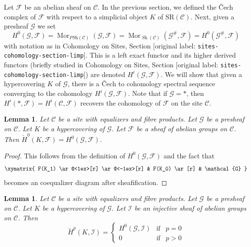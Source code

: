 \documentclass[10pt,a4paper]{article}
\theoremstyle{plain}
\newtheorem{lemma}[subsection]{Lemma}
\theoremstyle{definition}
\theoremstyle{remark}
\numberwithin{equation}{subsection}
\def\Mor{\mathop{\mathrm{Mor}}\nolimits}
\def\Sh{\mathop{\mathit{Sh}}\nolimits}
\begin{document}
\medskip\noindent
Let $\mathcal{F}$ be an abelian sheaf on $\mathcal{C}$.
In the previous section, we defined the {\v C}ech complex of $\mathcal{F}$
with respect to a simplicial object $K$ of $\text{SR}(\mathcal{C})$.
Next, given a presheaf $\mathcal{G}$ we set
$$
H^0(\mathcal{G}, \mathcal{F}) =
\Mor_{\textit{PSh}(\mathcal{C})}(\mathcal{G}, \mathcal{F}) =
\Mor_{\Sh(\mathcal{C})}(\mathcal{G}^\#, \mathcal{F}) =
H^0(\mathcal{G}^\#, \mathcal{F})
$$
with notation as in
Cohomology on Sites, Section \textnormal{[original label: \nolinkurl{sites-cohomology-section-limp}]}.
This is a left exact functor and its higher derived functors
(briefly studied in
Cohomology on Sites, Section \textnormal{[original label: \nolinkurl{sites-cohomology-section-limp}]})
are denoted $H^i(\mathcal{G}, \mathcal{F})$.
We will show that given a hypercovering $K$ of $\mathcal{G}$,
there is a {\v C}ech to cohomology spectral sequence converging to the
cohomology $H^i(\mathcal{G}, \mathcal{F})$.
Note that if $\mathcal{G} = *$, then
$H^i(*, \mathcal{F}) = H^i(\mathcal{C}, \mathcal{F})$ recovers
the cohomology of $\mathcal{F}$ on the site $\mathcal{C}$.

\begin{lemma}
\label{lemma-h0-cech-variant}
Let $\mathcal{C}$ be a site with equalizers and fibre products.
Let $\mathcal{G}$ be a presheaf on $\mathcal{C}$.
Let $K$ be a hypercovering of $\mathcal{G}$.
Let $\mathcal{F}$ be a sheaf of abelian groups on $\mathcal{C}$.
Then $\check{H}^0(K, \mathcal{F}) = H^0(\mathcal{G}, \mathcal{F})$.
\end{lemma}

\begin{proof}
This follows from the definition of $H^0(\mathcal{G}, \mathcal{F})$
and the fact that
$$
\xymatrix{
F(K_1) \ar@<1ex>[r] \ar@<-1ex>[r] &
F(K_0) \ar[r] & \mathcal{G}
}
$$
becomes an coequalizer diagram after sheafification.
\end{proof}

\begin{lemma}
\label{lemma-injective-trivial-cech-variant}
Let $\mathcal{C}$ be a site with equalizers and fibre products.
Let $\mathcal{G}$ be a presheaf on $\mathcal{C}$.
Let $K$ be a hypercovering of $\mathcal{G}$.
Let $\mathcal{I}$ be an injective sheaf of abelian groups on $\mathcal{C}$.
Then
$$
\check{H}^p(K, \mathcal{I}) =
\left\{
\begin{matrix}
H^0(\mathcal{G}, \mathcal{I}) & \text{if} & p = 0 \\
0 & \text{if} & p > 0
\end{matrix}
\right.
$$
\end{lemma}
\end{document}
